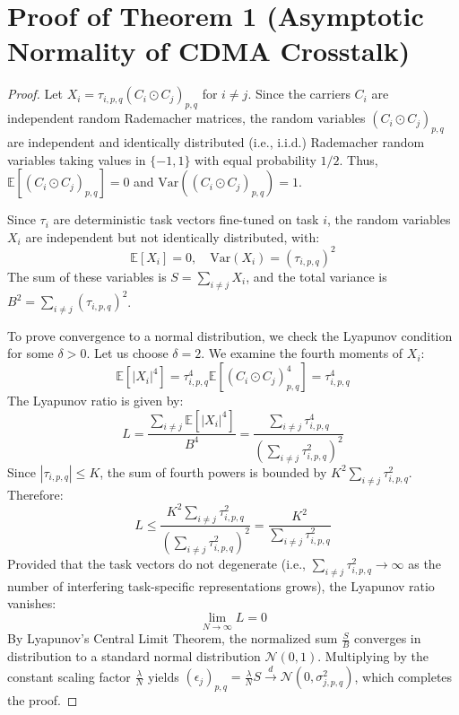 \documentclass{article}
\begin{document}
\section{Proof of Theorem 1 (Asymptotic Normality of CDMA Crosstalk)}
\label{sec:proof_theorem1}

\begin{proof}
Let $X_i = \tau_{i, p, q} (C_i \odot C_j)_{p, q}$ for $i \neq j$. Since the carriers $C_i$ are independent random Rademacher matrices, the random variables $(C_i \odot C_j)_{p, q}$ are independent and identically distributed (i.e., i.i.d.) Rademacher random variables taking values in $\{-1, 1\}$ with equal probability $1/2$. Thus, $\mathbb{E}[(C_i \odot C_j)_{p, q}] = 0$ and $\text{Var}((C_i \odot C_j)_{p, q}) = 1$.

Since $\tau_i$ are deterministic task vectors fine-tuned on task $i$, the random variables $X_i$ are independent but not identically distributed, with:
\begin{equation}
    \mathbb{E}[X_i] = 0, \quad \text{Var}(X_i) = (\tau_{i, p, q})^2
\end{equation}
The sum of these variables is $S = \sum_{i \neq j} X_i$, and the total variance is $B^2 = \sum_{i \neq j} (\tau_{i, p, q})^2$.

To prove convergence to a normal distribution, we check the Lyapunov condition for some $\delta > 0$. Let us choose $\delta = 2$. We examine the fourth moments of $X_i$:
\begin{equation}
    \mathbb{E}[|X_i|^4] = \tau_{i, p, q}^4 \mathbb{E}[(C_i \odot C_j)_{p, q}^4] = \tau_{i, p, q}^4
\end{equation}
The Lyapunov ratio is given by:
\begin{equation}
    L = \frac{\sum_{i \neq j} \mathbb{E}[|X_i|^4]}{B^4} = \frac{\sum_{i \neq j} \tau_{i, p, q}^4}{\left( \sum_{i \neq j} \tau_{i, p, q}^2 \right)^2}
\end{equation}
Since $|\tau_{i, p, q}| \le K$, the sum of fourth powers is bounded by $K^2 \sum_{i \neq j} \tau_{i, p, q}^2$. Therefore:
\begin{equation}
    L \le \frac{K^2 \sum_{i \neq j} \tau_{i, p, q}^2}{\left( \sum_{i \neq j} \tau_{i, p, q}^2 \right)^2} = \frac{K^2}{\sum_{i \neq j} \tau_{i, p, q}^2}
\end{equation}
Provided that the task vectors do not degenerate (i.e., $\sum_{i \neq j} \tau_{i, p, q}^2 \to \infty$ as the number of interfering task-specific representations grows), the Lyapunov ratio vanishes:
\begin{equation}
    \lim_{N \to \infty} L = 0
\end{equation}
By Lyapunov's Central Limit Theorem, the normalized sum $\frac{S}{B}$ converges in distribution to a standard normal distribution $\mathcal{N}(0, 1)$. Multiplying by the constant scaling factor $\frac{\lambda}{N}$ yields $(\epsilon_j)_{p, q} = \frac{\lambda}{N} S \xrightarrow{d} \mathcal{N}(0, \sigma^2_{j, p, q})$, which completes the proof.
\end{proof}
\end{document}
